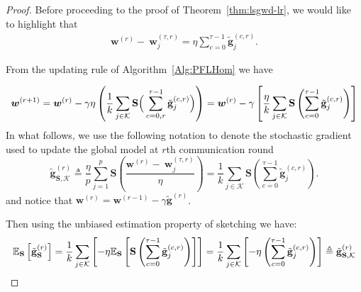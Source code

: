 \documentclass[twoside]{article}
\begin{document}
\begin{proof}
Before proceeding to the proof of Theorem~\ref{thm:lsgwd-lr}, we would like to highlight that 
\begin{align}
    \boldsymbol{w}^{(r)}- ~{\boldsymbol{w}}_{j}^{(\tau,r)}=\eta\sum_{c=0}^{\tau-1}\tilde{\mathbf{g}}_j^{(c,r)}.\label{eq:decent-smoothe}
\end{align}

From the updating rule of Algorithm~\ref{Alg:PFLHom} we have

{
\begin{align}\notag
     {\boldsymbol{w}}^{(r+1)}=\boldsymbol{w}^{(r)}-\gamma\eta\left(\frac{1}{k}\sum_{j\in\mathcal{K}}\mathbf{S}\Big(\sum_{c=0,r}^{\tau-1}\tilde{\mathbf{g}}_{j}^{(c,r)}\Big)\right)=\boldsymbol{w}^{(r)}-\gamma\left[\frac{\eta}{k}\sum_{j\in\mathcal{K}}\mathbf{S}\left(\sum_{c=0}^{\tau-1}\tilde{\mathbf{g}}_{j}^{(c,r)}\right)\right]
\end{align}
}
In what follows, we use the following notation to denote the stochastic gradient used to update the global model at $r$th communication round $$\tilde{\mathbf{g}}_{\mathbf{S},\mathcal{K}}^{(r)}\triangleq\frac{\eta}{p}\sum_{j=1}^{p}\mathbf{S}\left(\frac{\boldsymbol{w}^{(r)}- ~{\boldsymbol{w}}_{j}^{(\tau,r)}}{\eta}\right)=\frac{1}{k}\sum_{j\in\mathcal{K}}\mathbf{S}\left(\sum_{c=0}^{\tau-1}\tilde{\mathbf{g}}_j^{(c,r)}\right).$$ 
and notice that $\boldsymbol{w}^{(r)} = \boldsymbol{w}^{(r-1)} - \gamma \tilde{\mathbf{g}}^{(r)}$.


Then using the unbiased estimation property of sketching we have:
\begin{align}\notag
  \mathbb{E}_\mathbf{S}\left[\tilde{\mathbf{g}}_\mathbf{S}^{(r)}\right]=\frac{1}{k}\sum_{j\in\mathcal{K}}\left[-\eta\mathbb{E}_\mathbf{S}\left[ \mathbf{S}\left(\sum_{c=0}^{\tau-1}\tilde{\mathbf{g}}_j^{(c,r)}\right)\right]\right]=\frac{1}{k}\sum_{j\in\mathcal{K}}\left[-\eta\left(\sum_{c=0}^{\tau-1}\tilde{\mathbf{g}}_j^{(c,r)}\right)\right]\triangleq \tilde{\mathbf{g}}_{\mathbf{S},\mathcal{K}}^{(r)}
\end{align}






\end{proof}
\end{document}
